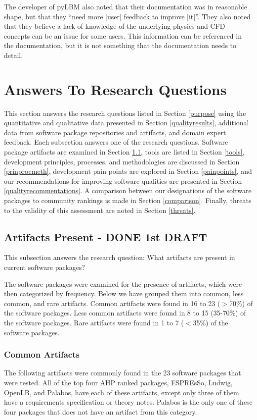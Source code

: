 \documentclass[12pt, notitlepage]{article}
\begin{document}
The developer of pyLBM also noted that their documentation was in reasonable shape, but that they ``need more [user] feedback to improve [it]''. They also noted that they believe a lack of knowledge of the underlying physics and CFD concepts can be an issue for some users. This information can be referenced in the documentation, but it is not something that the documentation needs to detail. 

\newpage


\section{Answers To Research Questions}\label{answersquestions}

This section answers the research questions listed in Section \ref{purpose} using the quantitative and qualitative data presented in Section \ref{qualityresults}, additional data from software package repositories and artifacts, and domain expert feedback. Each subsection answers one of the research questions. Software package artifacts are examined in Section \ref{artifacts}, tools are listed in Section \ref{tools}, development principles, processes, and methodologies are discussed in Section \ref{prinprocmeth}, development pain points are explored in Section \ref{painpoints}, and our recommendations for improving software qualities are presented in Section \ref{qualityrecommentations}. A comparison between our designations of the software packages to community rankings is made in Section \ref{comparison}. Finally, threats to the validity of this assessment are noted in Section \ref{threats}.

\subsection{Artifacts Present - DONE 1st DRAFT}\label{artifacts}

This subsection answers the research question: What artifacts are present in current software packages?

The software packages were examined for the presence of artifacts, which were then categorized by frequency. Below we have grouped them into common, less common, and rare artifacts. Common artifacts were found in 16 to 23 ($>$70\%) of the software packages. Less common artifacts were found in 8 to 15 (35-70\%) of the software packages. Rare artifacts were found in 1 to 7 ($<$35\%) of the software packages. 

\subsubsection{Common Artifacts}
The following artifacts were commonly found in the 23 software packages that were tested. All of the top four AHP ranked packages, ESPREsSo, Ludwig, OpenLB, and Palabos, have each of these artifacts, except only three of them have a requirements specification or theory notes. Palabos is the only one of these four packages that does not have an artifact from this category.
\end{document}
